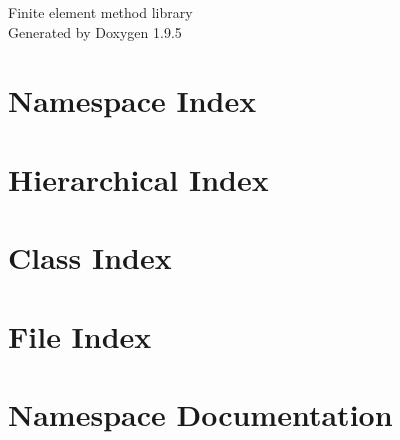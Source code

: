 \documentclass[twoside]{book}
\newcommand{\+}{\discretionary{\mbox{\scriptsize$\hookleftarrow$}}{}{}}
\newcommand{\clearemptydoublepage}{%
    \newpage{\pagestyle{empty}\cleardoublepage}%
  }
\begin{document}
  \raggedbottom
    \hypersetup{pageanchor=false,
                bookmarksnumbered=true,
                pdfencoding=unicode
               }
  \begin{titlepage}
  \vspace*{7cm}
  \begin{center}%
  {\Large Finite element method library}\\
  \vspace*{1cm}
  {\large Generated by Doxygen 1.9.5}\\
  \end{center}
  \end{titlepage}
  \clearemptydoublepage
  \tableofcontents
  \clearemptydoublepage
  \hypersetup{pageanchor=true}
\chapter{Namespace Index}

\chapter{Hierarchical Index}

\chapter{Class Index}

\chapter{File Index}

\chapter{Namespace Documentation}









\end{document}
